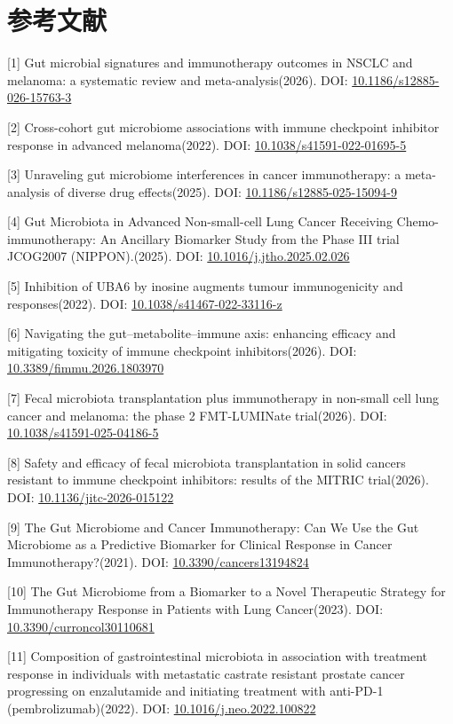 \section{参考文献}\label{ux53c2ux8003ux6587ux732e}

{[}1{]} Gut microbial signatures and immunotherapy outcomes in NSCLC and melanoma: a systematic review and meta-analysis(2026). DOI: \url{10.1186/s12885-026-15763-3}

{[}2{]} Cross-cohort gut microbiome associations with immune checkpoint inhibitor response in advanced melanoma(2022). DOI: \url{10.1038/s41591-022-01695-5}

{[}3{]} Unraveling gut microbiome interferences in cancer immunotherapy: a meta-analysis of diverse drug effects(2025). DOI: \url{10.1186/s12885-025-15094-9}

{[}4{]} Gut Microbiota in Advanced Non-small-cell Lung Cancer Receiving Chemo-immunotherapy: An Ancillary Biomarker Study from the Phase III trial JCOG2007 (NIPPON).(2025). DOI: \url{10.1016/j.jtho.2025.02.026}

{[}5{]} Inhibition of UBA6 by inosine augments tumour immunogenicity and responses(2022). DOI: \url{10.1038/s41467-022-33116-z}

{[}6{]} Navigating the gut--metabolite--immune axis: enhancing efficacy and mitigating toxicity of immune checkpoint inhibitors(2026). DOI: \url{10.3389/fimmu.2026.1803970}

{[}7{]} Fecal microbiota transplantation plus immunotherapy in non-small cell lung cancer and melanoma: the phase 2 FMT-LUMINate trial(2026). DOI: \url{10.1038/s41591-025-04186-5}

{[}8{]} Safety and efficacy of fecal microbiota transplantation in solid cancers resistant to immune checkpoint inhibitors: results of the MITRIC trial(2026). DOI: \url{10.1136/jitc-2026-015122}

{[}9{]} The Gut Microbiome and Cancer Immunotherapy: Can We Use the Gut Microbiome as a Predictive Biomarker for Clinical Response in Cancer Immunotherapy?(2021). DOI: \url{10.3390/cancers13194824}

{[}10{]} The Gut Microbiome from a Biomarker to a Novel Therapeutic Strategy for Immunotherapy Response in Patients with Lung Cancer(2023). DOI: \url{10.3390/curroncol30110681}

{[}11{]} Composition of gastrointestinal microbiota in association with treatment response in individuals with metastatic castrate resistant prostate cancer progressing on enzalutamide and initiating treatment with anti-PD-1 (pembrolizumab)(2022). DOI: \url{10.1016/j.neo.2022.100822}

